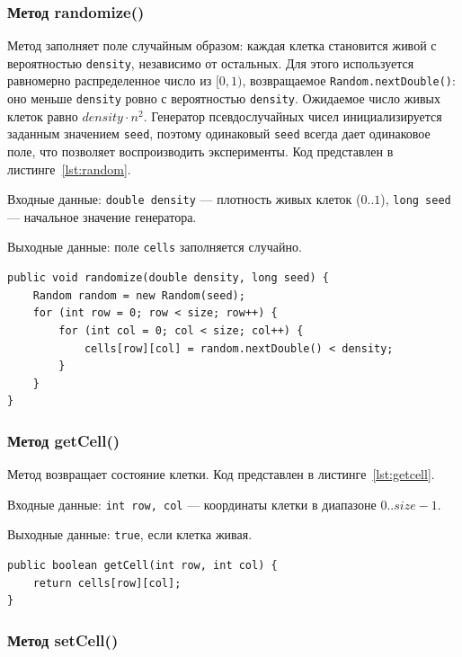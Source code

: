 \documentclass[a4paper,14pt]{extarticle}
\begin{document}
\subsubsection*{Метод randomize()}

Метод заполняет поле случайным образом: каждая клетка становится живой с вероятностью \texttt{density}, независимо от остальных. Для этого используется равномерно распределенное число из $[0, 1)$, возвращаемое \texttt{Random.nextDouble()}: оно меньше \texttt{density} ровно с вероятностью \texttt{density}. Ожидаемое число живых клеток равно $density \cdot n^2$. Генератор псевдослучайных чисел инициализируется заданным значением \texttt{seed}, поэтому одинаковый \texttt{seed} всегда дает одинаковое поле, что позволяет воспроизводить эксперименты. Код представлен в листинге~\ref{lst:random}.

Входные данные: \texttt{double density} --- плотность живых клеток ($0..1$), \texttt{long seed} --- начальное значение генератора.

Выходные данные: поле \texttt{cells} заполняется случайно.

\begin{lstlisting}[caption={Метод randomize()}, label={lst:random}]
public void randomize(double density, long seed) {
	Random random = new Random(seed);
	for (int row = 0; row < size; row++) {
		for (int col = 0; col < size; col++) {
			cells[row][col] = random.nextDouble() < density;
		}
	}
}
\end{lstlisting}

\subsubsection*{Метод getCell()}

Метод возвращает состояние клетки. Код представлен в листинге~\ref{lst:getcell}.

Входные данные: \texttt{int row, col} --- координаты клетки в диапазоне $0..size-1$.

Выходные данные: \texttt{true}, если клетка живая.

\begin{lstlisting}[caption={Метод getCell()}, label={lst:getcell}]
public boolean getCell(int row, int col) {
	return cells[row][col];
}
\end{lstlisting}

\subsubsection*{Метод setCell()}
\end{document}
